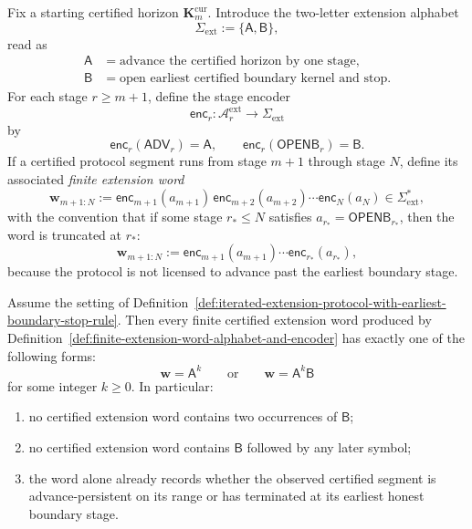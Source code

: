 \begin{definition}
\label{def:finite-extension-word-alphabet-and-encoder}
Fix a starting certified horizon \(\mathbf K_m^{\mathrm{cur}}\). Introduce the two-letter extension alphabet
\[
 \Sigma_{\mathrm{ext}} := \{\mathsf A,\mathsf B\},
\]
read as
\[
\begin{aligned}
 \mathsf A &= \text{advance the certified horizon by one stage},\\
 \mathsf B &= \text{open earliest certified boundary kernel and stop}.
\end{aligned}
\]
For each stage \(r\ge m+1\), define the stage encoder
\[
 \mathsf{enc}_r:\mathcal A^{\mathrm{ext}}_r\to\Sigma_{\mathrm{ext}}
\]
by
\[
 \mathsf{enc}_r(\mathsf{ADV}_r)=\mathsf A,
 \qquad
 \mathsf{enc}_r(\mathsf{OPENB}_r)=\mathsf B.
\]
If a certified protocol segment runs from stage \(m+1\) through stage \(N\), define its associated \emph{finite extension word}
\[
 \mathbf w_{m+1:N}
 :=
 \mathsf{enc}_{m+1}(a_{m+1})\,\mathsf{enc}_{m+2}(a_{m+2})\cdots\mathsf{enc}_N(a_N)
 \in \Sigma_{\mathrm{ext}}^{*},
\]
with the convention that if some stage \(r_*\le N\) satisfies \(a_{r_*}=\mathsf{OPENB}_{r_*}\), then the word is truncated at \(r_*\):
\[
 \mathbf w_{m+1:N}
 :=
 \mathsf{enc}_{m+1}(a_{m+1})\cdots\mathsf{enc}_{r_*}(a_{r_*}),
\]
because the protocol is not licensed to advance past the earliest boundary stage.
\end{definition}

\begin{proposition}
\label{prop:certified-extension-words-have-exactly-form-Ak-or-AkB}
Assume the setting of Definition~\ref{def:iterated-extension-protocol-with-earliest-boundary-stop-rule}. Then every finite certified extension word produced by Definition~\ref{def:finite-extension-word-alphabet-and-encoder} has exactly one of the following forms:
\[
 \mathbf w = \mathsf A^k
 \qquad\text{or}\qquad
 \mathbf w = \mathsf A^k\mathsf B
\]
for some integer \(k\ge 0\). In particular:
\begin{enumerate}[label=(\roman*)]
 \item no certified extension word contains two occurrences of \(\mathsf B\);
 \item no certified extension word contains \(\mathsf B\) followed by any later symbol;
 \item the word alone already records whether the observed certified segment is advance-persistent on its range or has terminated at its earliest honest boundary stage.
\end{enumerate}
\end{proposition}

